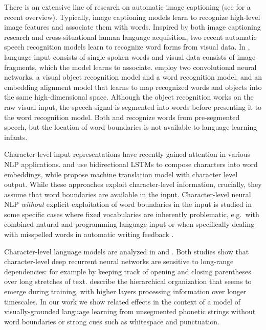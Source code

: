 There is an extensive line of research on automatic image captioning (see  for a recent overview). Typically, image captioning models learn to recognize high-level image features and associate them with words. Inspired by both image captioning research and cross-situational human language acquisition, two recent automatic speech recognition models learn to recognize word forms from visual data. In , language input consists of single spoken words and visual data consists of image fragments, which the model learns to associate.  employ two convolutional neural networks, a visual object recognition model and a word recognition model, and an embedding alignment model that learns to map recognized words and objects into the same high-dimensional space. Although the object recognition works on the raw visual input, the speech signal is segmented into words before presenting it to the word recognition model. Both  and  recognize words from pre-segmented speech, but the location of word boundaries is not available to language learning infants.

Character-level input representations have recently gained attention
in various NLP applications.  and
 use bidirectional LSTMs to compose
characters into word embeddings, while
 propose machine translation model with 
character level output. While these approaches exploit character-level
information, crucially, they assume that word boundaries are available
in the input.
Character-level neural NLP \textit{without} explicit exploitation of word boundaries in the input is studied in some specific cases where fixed vocabularies are inherently problematic, e.g.\ with combined natural and programming language input \cite{chrupala2013text} or when specifically dealing with misspelled words in automatic writing feedback \cite{xie2016neural}. 

Character-level language models are analyzed in
 and
. Both studies show that
character-level deep recurrent neural networks are sensitive to
long-range dependencies: for example by keeping track of opening and
closing parentheses over long stretches of
text.  describe the hierarchical
organization that seems to emerge during training, with higher layers
processing information over longer timescales. In our work we show
related effects in the context of a model of visually-grounded
language learning from unsegmented phonetic strings without word
boundaries or strong cues such as whitespace and punctuation.

